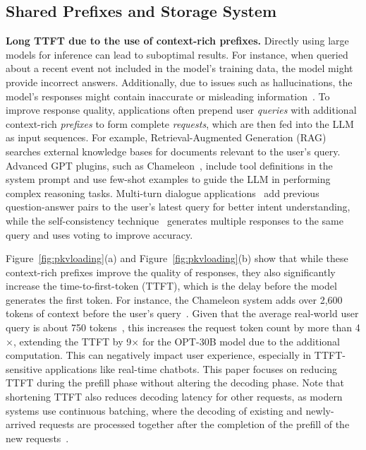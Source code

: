 \subsection{Shared Prefixes and Storage System}
\label{sec:iobottleneck}
\noindent \textbf{Long TTFT due to the use of context-rich prefixes.}
Directly using large models for inference can lead to suboptimal results. For instance, when queried about a recent event not included in the model's training data, the model might provide incorrect answers. Additionally, due to issues such as hallucinations, the model's responses might contain inaccurate or misleading information~\cite{siren-arxiv23}. To improve response quality, applications often prepend user \textit{queries} with additional context-rich \textit{prefixes} to form complete \textit{requests}, which are then fed into the LLM as input sequences.
For example, Retrieval-Augmented Generation (RAG)~\cite{rag-nips20} searches external knowledge bases for documents relevant to the user's query. Advanced GPT plugins, such as Chameleon~\cite{chameleon-nips23}, include tool definitions in the system prompt and use few-shot examples to guide the LLM in performing complex reasoning tasks. Multi-turn dialogue applications~\cite{attentionstore-atc24} add previous question-answer pairs to the user's latest query for better intent understanding, while the self-consistency technique~\cite{selfcons-ase23} generates multiple responses to the same query and uses voting to improve accuracy.

Figure~\ref{fig:pkvloading}(a) and Figure~\ref{fig:pkvloading}(b) show that while these context-rich prefixes improve the quality of responses, they also significantly increase the time-to-first-token (TTFT), which is the delay before the model generates the first token. For instance, the Chameleon system adds over 2,600 tokens of context before the user's query~\cite{chameleon-prompt}. Given that the average real-world user query is about 750 tokens~\cite{sharegpt}, this increases the request token count by more than 4$\times$, extending the TTFT by 9$\times$ for the OPT-30B model due to the additional computation. This can negatively impact user experience, especially in TTFT-sensitive applications like real-time chatbots. 
This paper focuses on reducing TTFT during the prefill phase without altering the decoding phase. Note that shortening TTFT also reduces decoding latency for other requests, as modern systems use continuous batching, where the decoding of existing and newly-arrived requests are processed together after the completion of the prefill of the new requests~\cite{orca-osdi22}.

